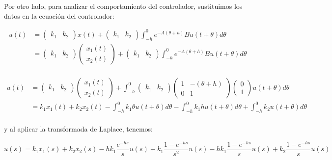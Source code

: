 \documentclass{article}
\begin{document}
    Por otro lado, para analizar el comportamiento del controlador,
sustituimos los datos en la ecuación del controlador:

\[
\begin{align}
u(t) &=
\begin{pmatrix}
k_1 & k_2
\end{pmatrix} x(t) +
\begin{pmatrix}
k_1 & k_2
\end{pmatrix}
\int_{-h}^0 e^{-A(\theta + h)} B u(t + \theta) d\theta \\
&=
\begin{pmatrix}
k_1 & k_2
\end{pmatrix}
\begin{pmatrix}
x_1(t) \\
x_2(t)
\end{pmatrix} +
\begin{pmatrix}
k_1 & k_2
\end{pmatrix}
\int_{-h}^0 e^{-A(\theta + h)} B u(t + \theta) d\theta \\
\end{align}
\]

    \[
\begin{align}
u(t) &=
\begin{pmatrix}
k_1 & k_2
\end{pmatrix}
\begin{pmatrix}
x_1(t) \\
x_2(t)
\end{pmatrix} +
\int_{-h}^0
\begin{pmatrix}
k_1 & k_2
\end{pmatrix}
\begin{pmatrix}
1 & - (\theta  +h) \\
0 & 1
\end{pmatrix}
\begin{pmatrix}
0 \\
1
\end{pmatrix} u(t + \theta) d\theta \\
&= k_1 x_1(t) + k_2 x_2(t) - \int_{-h}^0 k_1 \theta u(t + \theta) d\theta - \int_{-h}^0 k_1 h u(t + \theta) d\theta + \int_{-h}^0 k_2 u(t + \theta) d\theta \\
\end{align}
\]

y al aplicar la transformada de Laplace, tenemos:

\[
u(s) = k_1 x_1(s) + k_2 x_2(s) - h k_1 \frac{e^{-hs}}{s} u(s) + k_1 \frac{1 - e^{-hs}}{s^2} u(s) - h k_1 \frac{1 - e^{-hs}}{s} u(s) + k_2 \frac{1 - e^{-hs}}{s} u(s)
\]
\end{document}
